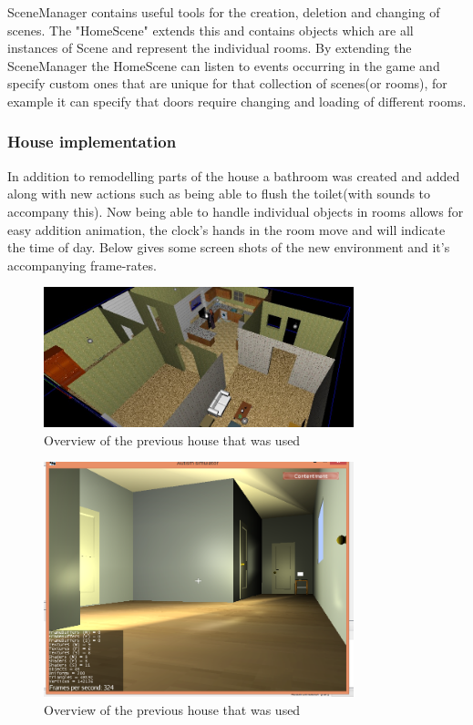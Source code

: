 \documentclass[11pt]{report}
\begin{document}
SceneManager contains useful tools for the creation, deletion and changing of scenes. The "HomeScene" extends this and contains objects which are all instances of Scene and represent the individual rooms. By extending the SceneManager the HomeScene can listen to events occurring in the game and specify custom ones that are unique for that collection of scenes(or rooms), for example it can specify that doors require changing and loading of different rooms. 

\subsubsection{House implementation}
In addition to remodelling parts of the house a bathroom was created and added along with new actions such as being able to flush the toilet(with sounds to accompany this). Now being able to handle individual objects in rooms allows for easy addition animation, the clock's hands in the room move and will indicate the time of day. Below gives some screen shots of the new environment and it's accompanying frame-rates. 

\begin{figure}[H]
\centering
\includegraphics[width=90mm]{images/old_fullhouse.jpg}
\caption{Overview of the previous house that was used}
\label{old_house}
\end{figure}

\begin{figure}[H]
\centering
\includegraphics[width=90mm]{images/new_hallway1.png}
\caption{Overview of the previous house that was used}
\label{old_house}
\end{figure}
\end{document}
